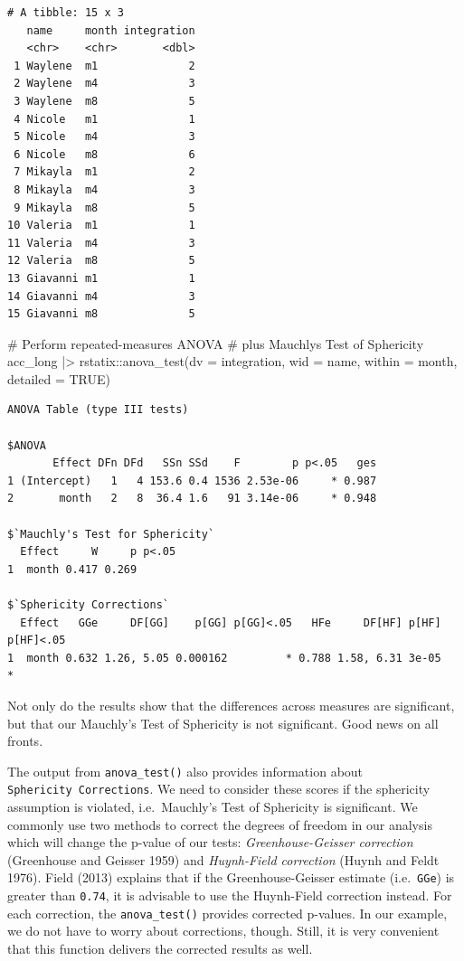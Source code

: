 \documentclass[
  letterpaper,
  DIV=11,
  numbers=noendperiod]{scrreprt}
\newenvironment{Shaded}{\begin{snugshade}}{\end{snugshade}}
\newcommand{\AttributeTok}[1]{\textcolor[rgb]{0.40,0.45,0.13}{#1}}
\newcommand{\CommentTok}[1]{\textcolor[rgb]{0.37,0.37,0.37}{#1}}
\newcommand{\ConstantTok}[1]{\textcolor[rgb]{0.56,0.35,0.01}{#1}}
\newcommand{\FunctionTok}[1]{\textcolor[rgb]{0.28,0.35,0.67}{#1}}
\newcommand{\NormalTok}[1]{\textcolor[rgb]{0.00,0.23,0.31}{#1}}
\newcommand{\SpecialCharTok}[1]{\textcolor[rgb]{0.37,0.37,0.37}{#1}}
\begin{document}
\begin{verbatim}
# A tibble: 15 x 3
   name     month integration
   <chr>    <chr>       <dbl>
 1 Waylene  m1              2
 2 Waylene  m4              3
 3 Waylene  m8              5
 4 Nicole   m1              1
 5 Nicole   m4              3
 6 Nicole   m8              6
 7 Mikayla  m1              2
 8 Mikayla  m4              3
 9 Mikayla  m8              5
10 Valeria  m1              1
11 Valeria  m4              3
12 Valeria  m8              5
13 Giavanni m1              1
14 Giavanni m4              3
15 Giavanni m8              5
\end{verbatim}

\begin{Shaded}
\begin{Highlighting}[]
\CommentTok{\# Perform repeated{-}measures ANOVA}
\CommentTok{\# plus Mauchly\textquotesingle{}s Test of Sphericity}
\NormalTok{acc\_long }\SpecialCharTok{|\textgreater{}}
\NormalTok{  rstatix}\SpecialCharTok{::}\FunctionTok{anova\_test}\NormalTok{(}\AttributeTok{dv =}\NormalTok{ integration,}
                      \AttributeTok{wid =}\NormalTok{ name,}
                      \AttributeTok{within =}\NormalTok{ month,}
                      \AttributeTok{detailed =} \ConstantTok{TRUE}\NormalTok{)}
\end{Highlighting}
\end{Shaded}

\begin{verbatim}
ANOVA Table (type III tests)

$ANOVA
       Effect DFn DFd   SSn SSd    F        p p<.05   ges
1 (Intercept)   1   4 153.6 0.4 1536 2.53e-06     * 0.987
2       month   2   8  36.4 1.6   91 3.14e-06     * 0.948

$`Mauchly's Test for Sphericity`
  Effect     W     p p<.05
1  month 0.417 0.269      

$`Sphericity Corrections`
  Effect   GGe     DF[GG]    p[GG] p[GG]<.05   HFe     DF[HF] p[HF] p[HF]<.05
1  month 0.632 1.26, 5.05 0.000162         * 0.788 1.58, 6.31 3e-05         *
\end{verbatim}

Not only do the results show that the differences across measures are
significant, but that our Mauchly's Test of Sphericity is not
significant. Good news on all fronts.

The output from \texttt{anova\_test()} also provides information about
\texttt{Sphericity\ Corrections}. We need to consider these scores if
the sphericity assumption is violated, i.e.~Mauchly's Test of Sphericity
is significant. We commonly use two methods to correct the degrees of
freedom in our analysis which will change the p-value of our tests:
\emph{Greenhouse-Geisser correction} (Greenhouse and Geisser 1959) and
\emph{Huynh-Field correction} (Huynh and Feldt 1976). Field (2013)
explains that if the Greenhouse-Geisser estimate (i.e.~\texttt{GGe}) is
greater than \texttt{0.74}, it is advisable to use the Huynh-Field
correction instead. For each correction, the \texttt{anova\_test()}
provides corrected p-values. In our example, we do not have to worry
about corrections, though. Still, it is very convenient that this
function delivers the corrected results as well.
\end{document}
